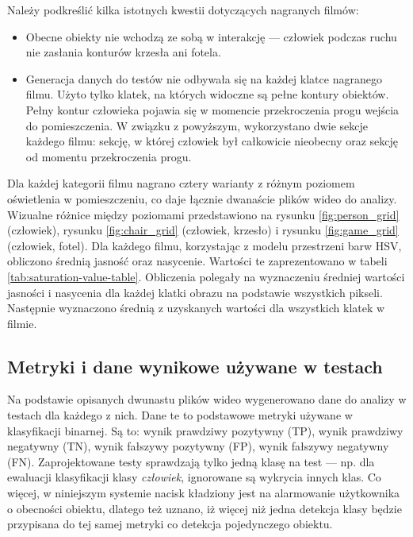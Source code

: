 Należy podkreślić kilka istotnych kwestii dotyczących nagranych filmów:
\begin{itemize}
    \item Obecne obiekty nie wchodzą ze sobą w interakcję --- człowiek podczas ruchu nie zasłania konturów krzesła ani fotela.
    \item Generacja danych do testów nie odbywała się na każdej klatce nagranego filmu. Użyto tylko klatek, na których widoczne są pełne kontury obiektów. Pełny kontur człowieka pojawia się w momencie przekroczenia progu wejścia do pomieszczenia. W związku z powyższym, wykorzystano dwie sekcje każdego filmu: sekcję, w której człowiek był całkowicie nieobecny oraz sekcję od momentu przekroczenia progu.
\end{itemize}

Dla każdej kategorii filmu nagrano cztery warianty z różnym poziomem oświetlenia w pomieszczeniu, co daje łącznie dwanaście plików wideo do analizy. Wizualne różnice między poziomami przedstawiono na rysunku \ref{fig:person_grid} (człowiek), rysunku \ref{fig:chair_grid} (człowiek, krzesło) i rysunku \ref{fig:game_grid} (człowiek, fotel). 
Dla każdego filmu, korzystając z modelu przestrzeni barw HSV, obliczono średnią jasność oraz nasycenie. Wartości te zaprezentowano w tabeli \ref{tab:saturation-value-table}. Obliczenia polegały na wyznaczeniu średniej wartości jasności i nasycenia dla każdej klatki obrazu na podstawie wszystkich pikseli. Następnie wyznaczono średnią z uzyskanych wartości dla wszystkich klatek w filmie.











\subsection{Metryki i dane wynikowe używane w testach}
Na podstawie opisanych dwunastu plików wideo wygenerowano dane do analizy w testach dla każdego z nich. Dane te to podstawowe metryki używane w klasyfikacji binarnej. Są to: wynik prawdziwy pozytywny (TP), wynik prawdziwy negatywny (TN), wynik fałszywy pozytywny (FP), wynik fałszywy negatywny (FN). 
Zaprojektowane testy sprawdzają tylko jedną klasę na test --- np. dla ewaluacji klasyfikacji klasy \emph{człowiek}, ignorowane są wykrycia innych klas. Co więcej, w niniejszym systemie nacisk kładziony jest na alarmowanie użytkownika o obecności obiektu, dlatego też uznano, iż więcej niż jedna detekcja klasy będzie przypisana do tej samej metryki co detekcja pojedynczego obiektu. 

